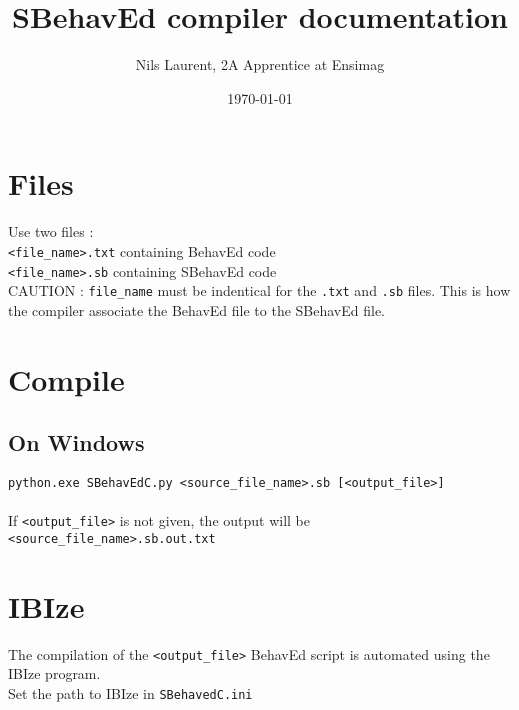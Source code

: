 \documentclass{article}
\title{SBehavEd compiler documentation}
\author{Nils Laurent, 2A Apprentice at Ensimag}
\date{\today}
\begin{document}
\maketitle

\section{Files}
Use two files :\\
\texttt{<file_name>.txt} containing BehavEd code\\
\texttt{<file_name>.sb} containing SBehavEd code\\
CAUTION : \texttt{file_name} must be indentical for the \texttt{.txt} and \texttt{.sb} files. This is how the compiler associate the BehavEd file to the SBehavEd file.

\section{Compile}
\subsection{On Windows}
\texttt{python.exe SBehavEdC.py <source_file_name>.sb [<output_file>]}\\
\vspace{1mm}\\
If \texttt{<output_file>} is not given, the output will be \texttt{<source_file_name>.sb.out.txt}

\section{IBIze}
The compilation of the \texttt{<output_file>} BehavEd script is automated using the IBIze program.\\
Set the path to IBIze in \texttt{SBehavedC.ini}
\end{document}
